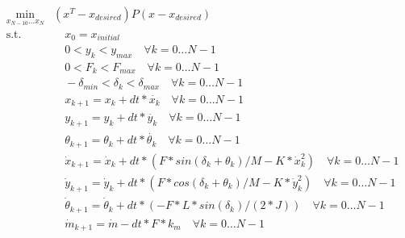 \begin{equation}
    \begin{aligned}
    \min_{x_{N-10}\dots x_N} & (x^T - x_{desired}) P (x - x_{desired}) \\
    \text{s.t.} 
    & \quad x_0 = x_{initial} \\
    & \quad 0 < y_k < y_{max} \quad \forall k=0\dots N-1\\
    & \quad 0 < F_k < F_{max} \quad \forall k=0\dots N-1\\ 
    & \quad -\delta_{min} < \delta_k < \delta_{max} \quad \forall k=0\dots N-1\\ 
    & \quad x_{k+1} = x_k + dt * \dot{x_k} \quad \forall k=0\dots N-1\\
    & \quad y_{k+1} = y_k + dt * \dot{y_k} \quad \forall k=0\dots N-1\\
    & \quad \theta_{k+1} = \theta_k + dt * \dot{\theta_k} \quad \forall k=0\dots N-1\\
    & \quad \dot{x}_{k+1} = \dot{x}_k + dt * (F*sin(\delta_k + \theta_k) /M - K* \dot{x}_k^2) \quad \forall k=0\dots N-1 \\
    & \quad \dot{y}_{k+1} = \dot{y}_k + dt * (F*cos(\delta_k + \theta_k) /M - K* \dot{y}_k^2) \quad \forall k=0\dots N-1 \\
    & \quad \dot{\theta}_{k+1} = \dot{\theta}_k + dt * (-F * L*sin(\delta_k) / (2*J)) \quad \forall k=0\dots N-1 \\
    & \quad \dot{m}_{k+1} = \dot{m} - dt * F * k_m \quad \forall k=0\dots N-1 \\

    \end{aligned}
\end{equation}
    